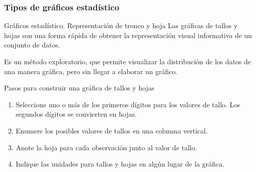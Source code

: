 \documentclass[11pt]{beamer}
\begin{document}
      \subsubsection*{Tipos de gráficos estadístico}

      \begin{frame}{Gráficos estadístico. Representación de tronco y hoja}
          Las gráficas de tallos y hojas son una forma rápida de obtener la representación visual informativa
de un conjunto de datos.

          Es un método exploratorio, que permite visualizar la distribución de los datos de una manera gráfica, pero sin llegar a elaborar un gráfico.

          Pasos para construir una gráfica de tallos y hojas
          \begin{enumerate}
              \item Seleccione uno o más de los primeros dígitos para los valores de tallo. Los segundos dígitos se convierten en hojas.
              \item Enumere los posibles valores de tallos en una columna vertical.
              \item Anote la hoja para cada observación junto al valor de tallo.
              \item Indique las unidades para tallos y hojas en algún lugar de la gráfica.
          \end{enumerate}



      \end{frame}
\end{document}
